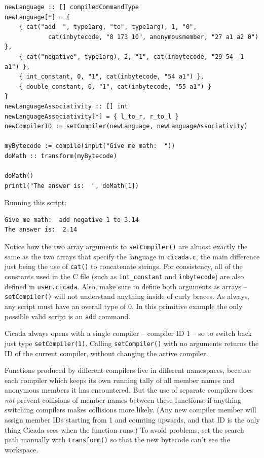 \documentclass{article}
\newenvironment{code}{
       \begin{list}{}{
               \setlength{\leftmargin}{.4in}
               \setlength{\rightmargin}{0in}
               \setlength{\topsep}{.2in}
       }
       \small
       \item[] }
       { \end{list}   }
\begin{document}
\begin{code} \begin{verbatim}
newLanguage :: [] compiledCommandType
newLanguage[*] = {
    { cat("add  ", type1arg, "to", type1arg), 1, "0",
            cat(inbytecode, "8 173 10", anonymousmember, "27 a1 a2 0") },
    { cat("negative", type1arg), 2, "1", cat(inbytecode, "29 54 -1 a1") },
    { int_constant, 0, "1", cat(inbytecode, "54 a1") },
    { double_constant, 0, "1", cat(inbytecode, "55 a1") }
}
newLanguageAssociativity :: [] int
newLanguageAssociativity[*] = { l_to_r, r_to_l }
newCompilerID := setCompiler(newLanguage, newLanguageAssociativity)

myBytecode := compile(input("Give me math:  "))
doMath :: transform(myBytecode)

doMath()
printl("The answer is:  ", doMath[1])
\end{verbatim} \end{code}

\noindent Running this script:

\begin{code} \begin{verbatim}
Give me math:  add negative 1 to 3.14
The answer is:  2.14
\end{verbatim} \end{code}

\noindent Notice how the two array arguments to \verb#setCompiler()# are almost exactly the same as the two arrays that specify the language in \verb#cicada.c#, the main difference just being the use of \verb#cat()# to concatenate strings.  For consistency, all of the constants used in the C file (such as \verb#int_constant# and \verb#inbytecode#) are also defined in \verb#user.cicada#.  Also, make sure to define both arguments as arrays -- \verb#setCompiler()# will not understand anything inside of curly braces.  As always, any script must have an overall type of 0.  In this primitive example the only possible valid script is an \verb#add# command.

Cicada always opens with a single compiler -- compiler ID 1 -- so to switch back just type \verb#setCompiler(1)#.  Calling \verb#setCompiler()# with no arguments returns the ID of the current compiler, without changing the active compiler.

Functions produced by different compilers live in different namespaces, because each compiler which keeps its own running tally of all member names and anonymous members it has encountered.  But the use of separate compilers does \emph{not} prevent collisions of member names between these functions:  if anything switching compilers makes collisions more likely.  (Any new compiler member will assign member IDs starting from 1 and counting upwards, and that ID is the only thing Cicada sees when the function runs.)  To avoid problems, set the search path manually with \verb#transform()# so that the new bytecode can't see the workspace.
\end{document}
